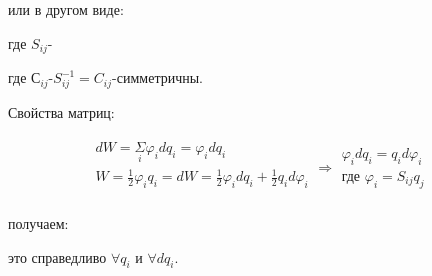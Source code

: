 или в другом виде:


где $S_{ij}$-


где $С_{ij}$-$S_{ij}^{-1}=C_{ij}$-симметричны.

Свойства матриц:

\[
\begin{aligned}
   \begin{array}{l|l}
      dW=\underset{i}{\Sigma}\varphi_i dq_i=\varphi_i dq_i \\
      W=\frac{1}{2}\varphi_i q_i=dW=\frac{1}{2}\varphi_i dq_i+\frac{1}{2}q_id\varphi_i \\
   \end{array}
   \Rightarrow
   \begin{array}{ll}
      \varphi_idq_i=q_id\varphi_i \\
      \text{где }\varphi_i=S_{ij}q_j
   \end{array}   
\end{aligned}
\]

получаем:


это справедливо $\forall q_i$ и $\forall dq_i$.